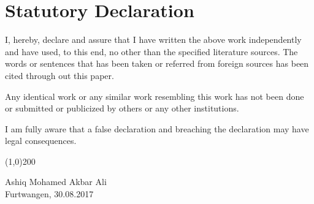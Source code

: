 \chapter{Statutory Declaration}

I, hereby, declare and assure that I have written the above work independently and have used, to this end, no other than the specified literature sources. The words or sentences that has been taken or referred from foreign sources has been cited through out this paper.
\vspace*{.5cm} \par
\noindent
Any identical work or any similar work resembling this work has not been done or submitted or publicized by others or any other institutions.
\vspace*{.5cm} \par
\noindent
I am fully aware that a false declaration and breaching the declaration may have legal consequences.

\vspace*{1.5cm} \par
\noindent
\line(1,0){200} \par
\noindent
Ashiq Mohamed Akbar Ali\\
Furtwangen, 30.08.2017